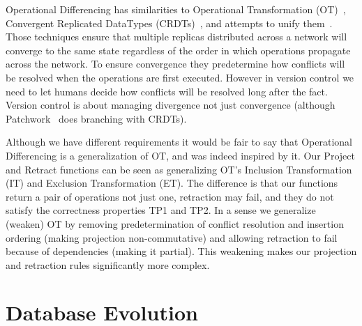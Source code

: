 \documentclass[english,submission]{programming}
\theoremstyle{definition}
\begin{document}
Operational Differencing has similarities to
Operational Transformation (OT)~\cite{Ellis89, Ressel96, Oster06}, Convergent Replicated DataTypes (CRDTs)~\cite{Shapiro11}, and attempts to unify them~\cite{braid}.
Those techniques ensure that multiple replicas distributed across a network will converge to the same state regardless of the order in which operations propagate across the network. To ensure convergence they predetermine how conflicts will be resolved when the operations are first executed. However in version control we need to let humans decide how conflicts will be resolved long after the fact. Version control is about managing divergence not just convergence (although Patchwork~\cite{patchwork} does branching with CRDTs).


Although we have different requirements it would be fair to say that Operational Differencing is a generalization of OT, and was indeed inspired by it. Our Project and Retract functions can be seen as generalizing OT's Inclusion Transformation (IT) and Exclusion Transformation (ET). The difference is that our functions return a pair of operations not just one, retraction may fail, and they do not satisfy the correctness properties TP1 and TP2. In a sense we generalize (weaken) OT by removing predetermination of conflict resolution and insertion ordering (making projection non-commutative) and allowing retraction to fail because of dependencies (making it partial). This weakening makes our projection and retraction rules significantly more complex.





\section{Database Evolution}\label{db-evolution}
\end{document}
